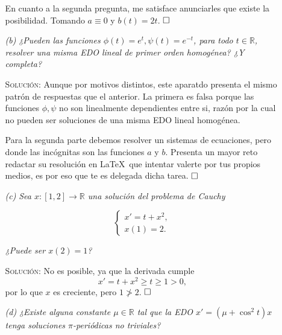 \documentclass{article}
\begin{document}
\begin{enumerate}
\begin{enumerate}
        En cuanto a la segunda pregunta, me satisface anunciarles que existe la posibilidad. Tomando $a \equiv 0$ y $b(t) = 2t$. $\hfill\square$

        \vspace{7px}

        \item[\textit{(b)}] \textit{¿Pueden las funciones $\phi(t) = e^t, \psi(t) = e^{-t}$, para todo $t \in \mathbb{R}$, resolver una misma EDO lineal de primer orden homogénea? ¿Y completa?}

        \vspace{7px}

        \textsc{Solución}: Aunque por motivos distintos, este aparatdo presenta el mismo patrón de respuestas que el anterior. La primera es falsa porque las funciones $\phi, \psi$ no son linealmente dependientes entre si, razón por la cual no pueden ser soluciones de una misma EDO lineal homogénea.

        Para la segunda parte debemos resolver un sistemas de ecuaciones, pero donde las incógnitas son las funciones $a$ y $b$. Presenta un mayor reto redactar su resolución en \LaTeX \, que intentar valerte por tus propios medios, es por eso que te es delegada dicha tarea. $\hfill\square$

        \vspace{7px}

        \item[\textit{(c)}] \textit{Sea $x : [1, 2] \rightarrow \mathbb{R}$ una solución del problema de Cauchy}
        
        \[
        \begin{cases}
            x' = t + x^2, \\
            x(1) = 2.
        \end{cases}
        \]

        \textit{¿Puede ser $x(2) = 1$?}

        \vspace{7px}

        \textsc{Solución}: No es posible, ya que la derivada cumple \[x' = t + x^2 \geq t \geq 1 > 0,\] por lo que $x$ es creciente, pero $1 \not > 2$. $\hfill\square$

        \vspace{7px}

        \item[\textit{(d)}] \textit{¿Existe alguna constante $\mu \in \mathbb{R}$ tal que la EDO $x' = (\mu + \cos^2t)x$ tenga soluciones $\pi$-periódicas no triviales?}


\end{enumerate}
\end{enumerate}
\end{document}
